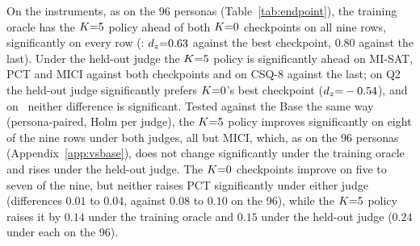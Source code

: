 On the instruments, as on the 96 personas (Table~\ref{tab:endpoint}), the training oracle has the
$K{=}5$ policy ahead of both $K{=}0$ checkpoints on all nine rows, significantly on every row (\QQ:
$d_z{=}0.63$ against the best checkpoint, $0.80$ against the last). Under the held-out judge the
$K{=}5$ policy is significantly ahead on MI-SAT, PCT and MICI against both checkpoints and on CSQ-8
against the last; on Q2 the held-out judge significantly prefers $K{=}0$'s best checkpoint ($d_z{=}-0.54$), and on
\QQ\ neither difference is significant. Tested against the Base the same way (persona-paired, Holm
per judge), the $K{=}5$ policy improves significantly on eight of the nine rows under both judges, all
but MICI, which, as on the 96 personas (Appendix~\ref{app:vsbase}), does not change significantly
under the training oracle and rises under the held-out judge. The $K{=}0$ checkpoints improve on five
to seven of the nine, but neither raises PCT significantly under either judge (differences $0.01$
to $0.04$, against $0.08$ to $0.10$ on the 96), while the $K{=}5$ policy raises it by $0.14$ under the
training oracle and $0.15$ under the held-out judge ($0.24$ under each on the 96).

